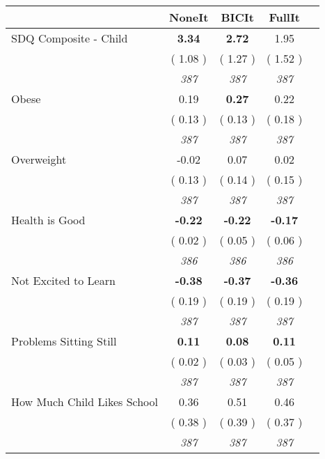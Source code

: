 \begin{tabular}{l c c c c}
\toprule
 & NoneIt & BICIt & FullIt \\
\midrule
SDQ Composite - Child & \textbf{      3.34 } & \textbf{      2.72 } &      1.95 \\
& (     1.08 ) & (     1.27 ) & (     1.52 ) \\
& \textit{ 387 } & \textit{ 387 } & \textit{ 387 } \\
Obese &      0.19 & \textbf{      0.27 } &      0.22 \\
& (     0.13 ) & (     0.13 ) & (     0.18 ) \\
& \textit{ 387 } & \textit{ 387 } & \textit{ 387 } \\
Overweight &     -0.02 &      0.07 &      0.02 \\
& (     0.13 ) & (     0.14 ) & (     0.15 ) \\
& \textit{ 387 } & \textit{ 387 } & \textit{ 387 } \\
Health is Good & \textbf{     -0.22 } & \textbf{     -0.22 } & \textbf{     -0.17 } \\
& (     0.02 ) & (     0.05 ) & (     0.06 ) \\
& \textit{ 386 } & \textit{ 386 } & \textit{ 386 } \\
Not Excited to Learn & \textbf{     -0.38 } & \textbf{     -0.37 } & \textbf{     -0.36 } \\
& (     0.19 ) & (     0.19 ) & (     0.19 ) \\
& \textit{ 387 } & \textit{ 387 } & \textit{ 387 } \\
Problems Sitting Still & \textbf{      0.11 } & \textbf{      0.08 } & \textbf{      0.11 } \\
& (     0.02 ) & (     0.03 ) & (     0.05 ) \\
& \textit{ 387 } & \textit{ 387 } & \textit{ 387 } \\
How Much Child Likes School &      0.36 &      0.51 &      0.46 \\
& (     0.38 ) & (     0.39 ) & (     0.37 ) \\
& \textit{ 387 } & \textit{ 387 } & \textit{ 387 } \\
\bottomrule
\end{tabular}
